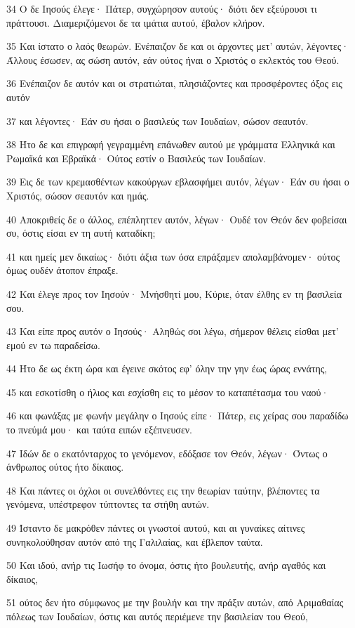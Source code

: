 \par 34 Ο δε Ιησούς έλεγε· Πάτερ, συγχώρησον αυτούς· διότι δεν εξεύρουσι τι πράττουσι. Διαμεριζόμενοι δε τα ιμάτια αυτού, έβαλον κλήρον.
\par 35 Και ίστατο ο λαός θεωρών. Ενέπαιζον δε και οι άρχοντες μετ' αυτών, λέγοντες· Άλλους έσωσεν, ας σώση αυτόν, εάν ούτος ήναι ο Χριστός ο εκλεκτός του Θεού.
\par 36 Ενέπαιζον δε αυτόν και οι στρατιώται, πλησιάζοντες και προσφέροντες όξος εις αυτόν
\par 37 και λέγοντες· Εάν συ ήσαι ο βασιλεύς των Ιουδαίων, σώσον σεαυτόν.
\par 38 Ήτο δε και επιγραφή γεγραμμένη επάνωθεν αυτού με γράμματα Ελληνικά και Ρωμαϊκά και Εβραϊκά· Ούτος εστίν ο Βασιλεύς των Ιουδαίων.
\par 39 Εις δε των κρεμασθέντων κακούργων εβλασφήμει αυτόν, λέγων· Εάν συ ήσαι ο Χριστός, σώσον σεαυτόν και ημάς.
\par 40 Αποκριθείς δε ο άλλος, επέπληττεν αυτόν, λέγων· Ουδέ τον Θεόν δεν φοβείσαι συ, όστις είσαι εν τη αυτή καταδίκη;
\par 41 και ημείς μεν δικαίως· διότι άξια των όσα επράξαμεν απολαμβάνομεν· ούτος όμως ουδέν άτοπον έπραξε.
\par 42 Και έλεγε προς τον Ιησούν· Μνήσθητί μου, Κύριε, όταν έλθης εν τη βασιλεία σου.
\par 43 Και είπε προς αυτόν ο Ιησούς· Αληθώς σοι λέγω, σήμερον θέλεις είσθαι μετ' εμού εν τω παραδείσω.
\par 44 Ήτο δε ως έκτη ώρα και έγεινε σκότος εφ' όλην την γην έως ώρας εννάτης,
\par 45 και εσκοτίσθη ο ήλιος και εσχίσθη εις το μέσον το καταπέτασμα του ναού·
\par 46 και φωνάξας με φωνήν μεγάλην ο Ιησούς είπε· Πάτερ, εις χείρας σου παραδίδω το πνεύμά μου· και ταύτα ειπών εξέπνευσεν.
\par 47 Ιδών δε ο εκατόνταρχος το γενόμενον, εδόξασε τον Θεόν, λέγων· Όντως ο άνθρωπος ούτος ήτο δίκαιος.
\par 48 Και πάντες οι όχλοι οι συνελθόντες εις την θεωρίαν ταύτην, βλέποντες τα γενόμενα, υπέστρεφον τύπτοντες τα στήθη αυτών.
\par 49 Ίσταντο δε μακρόθεν πάντες οι γνωστοί αυτού, και αι γυναίκες αίτινες συνηκολούθησαν αυτόν από της Γαλιλαίας, και έβλεπον ταύτα.
\par 50 Και ιδού, ανήρ τις Ιωσήφ το όνομα, όστις ήτο βουλευτής, ανήρ αγαθός και δίκαιος,
\par 51 ούτος δεν ήτο σύμφωνος με την βουλήν και την πράξιν αυτών, από Αριμαθαίας πόλεως των Ιουδαίων, όστις και αυτός περιέμενε την βασιλείαν του Θεού,
